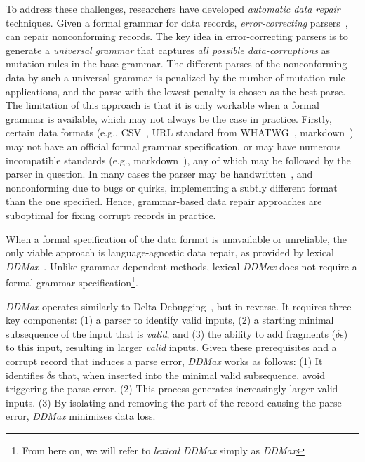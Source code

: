 \documentclass[sigconf,review,anonymous]{acmart}
\newcommand{\dtask}{data repair\xspace}
\newcommand{\ddmax}{\textit{DDMax}\xspace}
\begin{document}
To address these challenges, researchers have developed \emph{automatic \dtask}
techniques.
Given a formal grammar for data records,
\emph{error-correcting} parsers~\cite{aho1972minimum,diekmann2020dont,parr2011ll}, can
repair nonconforming records.
The key idea in error-correcting parsers is to generate a \emph{universal grammar}
that captures \emph{all possible data-corruptions} as mutation rules
in the base grammar.
The different parses of the nonconforming data by such a universal grammar is
penalized by the number of mutation rule applications, and the parse with the
lowest penalty is chosen as the best parse.
The limitation of this approach is that it is only workable
when a formal grammar is available,
which may not always be the case in practice.
Firstly, certain data formats (e.g., CSV~\cite{taocp},
URL standard from WHATWG~\cite{whatwgurl,urldisagree}, markdown~\cite{gruber2004markdown})
may not have an official formal grammar specification, or may
have numerous incompatible standards
(e.g., markdown~\cite{gruber2004markdown}), any of which may be followed by the
parser in question. In many cases the parser may be handwritten~\cite{uncommongrammars,uncommongrammars2}, and nonconforming due to bugs or quirks,
implementing a subtly different format than the one specified.
Hence, grammar-based \dtask approaches
are suboptimal for fixing corrupt records in practice.



When a formal specification of the data format is unavailable or unreliable,
the only viable approach is language-agnostic \dtask, as provided by lexical
\ddmax~\cite{kirschner2020debugging}. Unlike grammar-dependent methods, lexical
\ddmax does not require a formal grammar specification\footnote{From here on,
we will refer to \emph{lexical} \ddmax simply as \ddmax}.

\ddmax operates similarly to Delta Debugging~\cite{zeller2002simplifying}, but
in reverse. It requires three key components: (1) a parser to identify valid
inputs, (2) a starting minimal subsequence of the input that is \emph{valid},
and (3) the ability to add fragments ($\delta$s) to this input, resulting in
larger \emph{valid} inputs. Given these prerequisites and a corrupt record that
induces a parse error, \ddmax works as follows: (1) It identifies $\delta$s
that, when inserted into the minimal valid subsequence, avoid triggering the
parse error. (2) This process generates increasingly larger valid inputs. (3) By
isolating and removing the part of the record causing the parse error, \ddmax
minimizes data loss.
\end{document}
